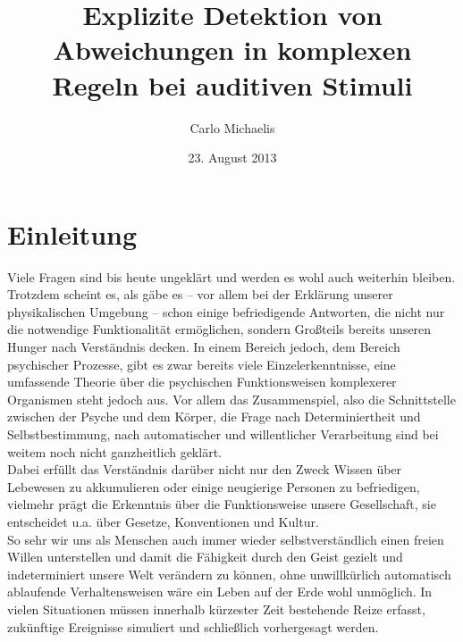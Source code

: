 \documentclass[doc,a4paper,12pt]{apa6}
\title{Explizite Detektion von Abweichungen in komplexen Regeln bei auditiven Stimuli}
\author{Carlo Michaelis}
\date{23. August 2013}
\affiliation{Universität Leipzig}
\begin{document}


\section{Einleitung}

Viele Fragen sind bis heute ungeklärt und werden es wohl auch weiterhin bleiben. Trotzdem scheint es, als gäbe es – vor allem bei der Erklärung unserer physikalischen Umgebung – schon einige befriedigende Antworten, die nicht nur die notwendige Funktionalität ermöglichen, sondern Großteils bereits unseren Hunger nach Verständnis decken. In einem Bereich jedoch, dem Bereich psychischer Prozesse, gibt es zwar bereits viele Einzelerkenntnisse, eine umfassende Theorie über die psychischen Funktionsweisen komplexerer Organismen steht jedoch aus. Vor allem das Zusammenspiel, also die Schnittstelle zwischen der Psyche und dem Körper, die Frage nach Determiniertheit und Selbstbestimmung, nach automatischer und willentlicher Verarbeitung sind bei weitem noch nicht ganzheitlich geklärt.\\
Dabei erfüllt das Verständnis darüber nicht nur den Zweck Wissen über Lebewesen zu akkumulieren oder einige neugierige Personen zu befriedigen, vielmehr prägt die Erkenntnis über die Funktionsweise unsere Gesellschaft, sie entscheidet u.a. über Gesetze, Konventionen und Kultur.\\
So sehr wir uns als Menschen auch immer wieder selbstverständlich einen freien Willen unterstellen und damit die Fähigkeit durch den Geist gezielt und indeterminiert unsere Welt verändern zu können, ohne unwillkürlich automatisch ablaufende Verhaltensweisen wäre ein Leben auf der Erde wohl unmöglich. In vielen Situationen müssen innerhalb kürzester Zeit bestehende Reize erfasst, zukünftige Ereignisse simuliert und schließlich vorhergesagt werden.
\end{document}
